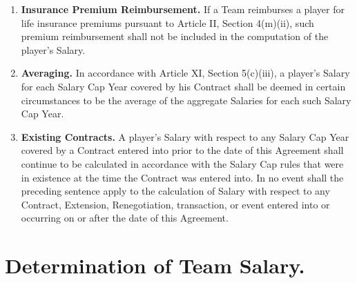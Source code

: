 \documentclass[
]{book}
\begin{document}
\begin{enumerate}
\item
  \textbf{Insurance Premium Reimbursement.} If a Team reimburses a player for life insurance premiums pursuant to Article II, Section 4(m)(ii), such premium reimbursement shall not be included in the computation of the player's Salary.
\item
  \textbf{Averaging.} In accordance with Article XI, Section 5(c)(iii), a player's Salary for each Salary Cap Year covered by his Contract shall be deemed in certain circumstances to be the average of the aggregate Salaries for each such Salary Cap Year.
\item
  \textbf{Existing Contracts.} A player's Salary with respect to any Salary Cap Year covered by a Contract entered into prior to the date of this Agreement shall continue to be calculated in accordance with the Salary Cap rules that were in existence at the time the Contract was entered into. In no event shall the preceding sentence apply to the calculation of Salary with respect to any Contract, Extension, Renegotiation, transaction, or event entered into or occurring on or after the date of this Agreement.
\end{enumerate}

\hypertarget{determination-of-team-salary.}{%
\section{Determination of Team Salary.}\label{determination-of-team-salary.}}
\end{document}
